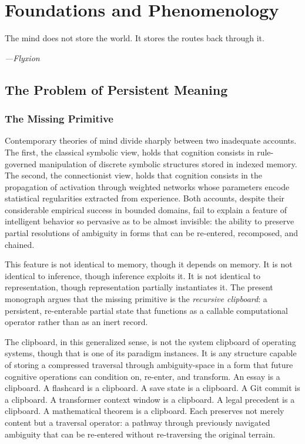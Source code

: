 \documentclass[12pt,oneside]{book}
\theoremstyle{plain}
\theoremstyle{definition}
\theoremstyle{plain}
\begin{document}
\tableofcontents

\mainmatter

\part{Foundations and Phenomenology}

\epigraph{The mind does not store the world. It stores the routes back through it.}{\textit{---Flyxion}}

\chapter{The Problem of Persistent Meaning}
\label{ch:problem}

\section{The Missing Primitive}

Contemporary theories of mind divide sharply between two inadequate accounts. The first, the classical symbolic view, holds that cognition consists in rule-governed manipulation of discrete symbolic structures stored in indexed memory. The second, the connectionist view, holds that cognition consists in the propagation of activation through weighted networks whose parameters encode statistical regularities extracted from experience. Both accounts, despite their considerable empirical success in bounded domains, fail to explain a feature of intelligent behavior so pervasive as to be almost invisible: the ability to preserve partial resolutions of ambiguity in forms that can be re-entered, recomposed, and chained.

This feature is not identical to memory, though it depends on memory. It is not identical to inference, though inference exploits it. It is not identical to representation, though representation partially instantiates it. The present monograph argues that the missing primitive is the \emph{recursive clipboard}: a persistent, re-enterable partial state that functions as a callable computational operator rather than as an inert record.

The clipboard, in this generalized sense, is not the system clipboard of operating systems, though that is one of its paradigm instances. It is any structure capable of storing a compressed traversal through ambiguity-space in a form that future cognitive operations can condition on, re-enter, and transform. An essay is a clipboard. A flashcard is a clipboard. A save state is a clipboard. A Git commit is a clipboard. A transformer context window is a clipboard. A legal precedent is a clipboard. A mathematical theorem is a clipboard. Each preserves not merely content but a traversal operator: a pathway through previously navigated ambiguity that can be re-entered without re-traversing the original terrain.
\end{document}

